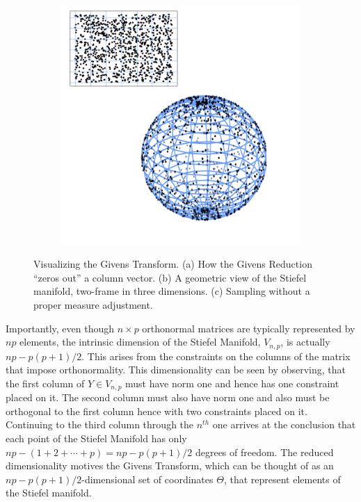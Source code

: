 \documentclass{article}
\begin{document}
\begin{figure}
\begin{subfigure}[b]{0.3\textwidth}
        \caption{}
        \label{fig:GivensReductionm}
    \end{subfigure}
    ~ %
    \begin{subfigure}[b]{0.3\textwidth}
        \includegraphics[width=\textwidth]{AreaForm.pdf}
        \caption{}
        \label{fig:AreaForm}
    \end{subfigure}
    \caption{Visualizing the Givens Transform. (a) How the Givens Reduction ``zeros out'' a column vector. (b) A geometric view of the Stiefel manifold, two-frame in three dimensions. (c) Sampling without a proper measure adjustment. }\label{fig:Givens}
\end{figure}
 
Importantly, even though $n \times p$ orthonormal matrices are typically represented by $np$ elements, the intrinsic dimension of the Stiefel Manifold, $V_{n,p}$, is actually $np-p(p+1)/2$. This arises from the constraints on the columns of the matrix that impose orthonormality.  This dimensionality can be seen by observing, that the first column of $Y \in V_{n,p}$ must have norm one and hence has one constraint placed on it. The second column must also have norm one and also must be orthogonal to the first column hence with two constraints placed on it.  Continuing to the third column through the $n^{th}$ one arrives at the conclusion that each point of the Stiefel Manifold has only $np - (1+2+\cdots+p) =np-p(p+1)/2$ degrees of freedom.  The reduced dimensionality motives the Givens Transform, which can be thought of as an $np-p(p+1)/2$-dimensional set of coordinates $\Theta$, that represent elements of the Stiefel manifold.
\end{document}
